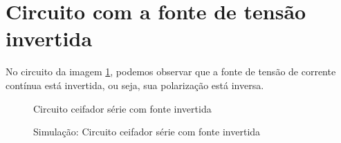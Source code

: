 \section{Circuito com a fonte de tensão invertida}

No circuito da imagem \ref{fig:ImagemSlide02}, podemos observar que a fonte de tensão de corrente contínua está invertida, ou seja, sua polarização está inversa.

\begin{figure}[H]
    \centering
    \caption{Circuito ceifador série com fonte invertida}
    \vspace{-0.3cm}
    \label{fig:ImagemSlide02}
\end{figure}

\begin{figure}[H]
    \centering
    \caption{Simulação: Circuito ceifador série com fonte invertida}
    \vspace{-0.3cm}
    \label{fig:SimulacaoCircuito02}
\end{figure}

